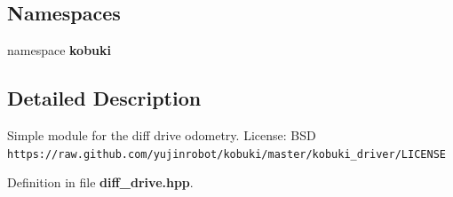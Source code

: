 \subsection*{\-Namespaces}
\begin{DoxyCompactItemize}
\item 
namespace {\bf kobuki}
\end{DoxyCompactItemize}


\subsection{\-Detailed \-Description}
\-Simple module for the diff drive odometry. \-License\-: \-B\-S\-D {\tt https\-://raw.\-github.\-com/yujinrobot/kobuki/master/kobuki\-\_\-driver/\-L\-I\-C\-E\-N\-S\-E} 

\-Definition in file {\bf diff\-\_\-drive.\-hpp}.

